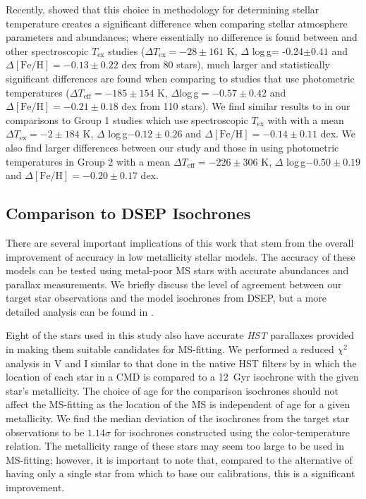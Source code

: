 \documentclass[revtex4]{emulateapj}
\begin{document}
Recently, \citet{Roed2014} showed that this choice in methodology for determining stellar temperature creates a significant difference when comparing stellar atmosphere parameters and abundances; where essentially no difference is found between \citet{Roed2014} and other spectroscopic $T_\mathrm{ex}$ studies ($\Delta T_\mathrm{ex} = -28\pm161$ K, $\Delta$ log\,g= -0.24$\pm0.41$ and $\Delta\mathrm{[Fe/H]} = -0.13\pm0.22$ dex from 80 stars), much larger and statistically significant differences are found when comparing to studies that use photometric temperatures ($\Delta T_\mathrm{eff} = -185\pm154$ K, $\Delta$log\,g$ = -0.57\pm0.42$ and $\Delta\mathrm{[Fe/H]} = -0.21\pm0.18$ dex from 110 stars).  We find similar results to \citet{Roed2014} in our comparisons to Group 1 studies which use spectroscopic $T_\mathrm{ex}$ with with a mean $\Delta T_\mathrm{ex} = -2\pm184$ K, $\Delta$ log\,g$-0.12\pm0.26$ and $\Delta\mathrm{[Fe/H]}=-0.14\pm0.11$ dex.  We also find larger differences between our study and those in using photometric temperatures in Group 2 with a mean $\Delta T_\mathrm{eff} = -226\pm306$ K, $\Delta$ log\,g$-0.50\pm0.19$ and $\Delta\mathrm{[Fe/H]}=-0.20\pm0.17$ dex.

\subsection{Comparison to DSEP Isochrones}
There are several important implications of this work that stem from the overall improvement of accuracy in low metallicity stellar models.  The accuracy of these models can be tested using metal-poor MS stars with accurate abundances and parallax measurements.  We briefly discuss the level of agreement between our target star observations and the model isochrones from DSEP, but a more detailed analysis can be found in \citet{Chab2016}.

Eight of the stars used in this study also have accurate \emph{HST} parallaxes provided in \citet{Chab2016} making them suitable candidates for MS-fitting.  We performed a reduced $\chi^2$ analysis in V and I similar to that done in the native HST filters by \citet{Chab2016} in which the location of each star in a CMD is compared to a 12~Gyr isochrone with the given star's metallicity.  The choice of age for the comparison isochrones should not affect the MS-fitting as the location of the MS is independent of age for a given metallicity.  We find the median deviation of the isochrones from the target star observations to be $1.14\sigma$ for isochrones constructed using the \citet{VC2003} color-temperature relation.  The metallicity range of these stars may seem too large to be used in MS-fitting; however, it is important to note that, compared to the alternative of having only a single star from which to base our calibrations, this is a significant improvement.
\end{document}

